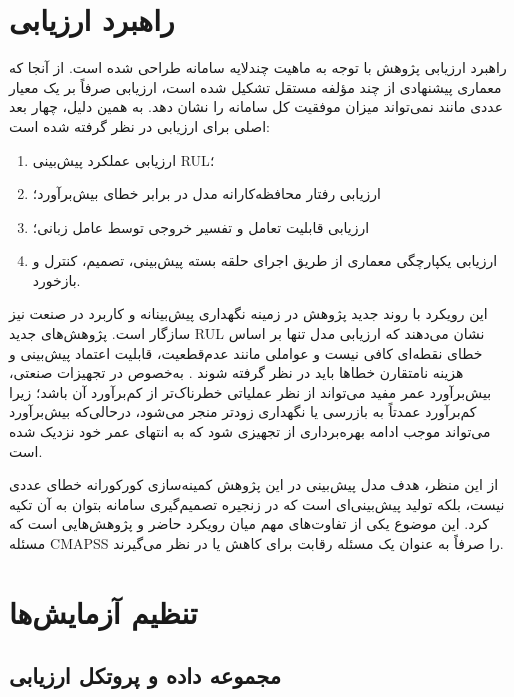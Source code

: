\section{راهبرد ارزیابی}
\label{sec:evaluation-strategy}

راهبرد ارزیابی پژوهش با توجه به ماهیت چندلایه سامانه طراحی شده است. از آنجا که معماری پیشنهادی از چند مؤلفه مستقل تشکیل شده است، ارزیابی صرفاً بر یک معیار عددی مانند  نمی‌تواند میزان موفقیت کل سامانه را نشان دهد. به همین دلیل، چهار بعد اصلی برای ارزیابی در نظر گرفته شده است:

\begin{enumerate}
	\item ارزیابی عملکرد پیش‌بینی \gls{RUL}؛
	\item ارزیابی رفتار محافظه‌کارانه مدل در برابر خطای بیش‌برآورد؛
	\item ارزیابی قابلیت تعامل و تفسیر خروجی توسط عامل زبانی؛
	\item ارزیابی یکپارچگی معماری از طریق اجرای حلقه بسته پیش‌بینی، تصمیم، کنترل و بازخورد.
\end{enumerate}

این رویکرد با روند جدید پژوهش در زمینه نگهداری پیش‌بینانه و کاربرد در صنعت نیز سازگار است. پژوهش‌های جدید \gls{RUL} نشان می‌دهند که ارزیابی مدل تنها بر اساس خطای نقطه‌ای کافی نیست و عواملی مانند عدم‌قطعیت، قابلیت اعتماد پیش‌بینی و هزینه نامتقارن خطاها باید در نظر گرفته شوند \cite{diao2026reliable,hatipoglu2025matrix}. به‌خصوص در تجهیزات صنعتی، بیش‌برآورد عمر مفید می‌تواند از نظر عملیاتی خطرناک‌تر از کم‌برآورد آن باشد؛ زیرا کم‌برآورد عمدتاً به بازرسی یا نگهداری زودتر منجر می‌شود، درحالی‌که بیش‌برآورد می‌تواند موجب ادامه بهره‌برداری از تجهیزی شود که به انتهای عمر خود نزدیک شده است.

از این منظر، هدف مدل پیش‌بینی در این پژوهش کمینه‌سازی کورکورانه خطای عددی نیست، بلکه تولید پیش‌بینی‌ای است که در زنجیره تصمیم‌گیری سامانه بتوان به آن تکیه کرد. این موضوع یکی از تفاوت‌های مهم میان رویکرد حاضر و پژوهش‌هایی است که مسئله CMAPSS را صرفاً به عنوان یک مسئله رقابت برای کاهش  یا  در نظر می‌گیرند.

\section{تنظیم آزمایش‌ها}
\label{sec:experiment-setup}

\subsection{مجموعه داده و پروتکل ارزیابی}

